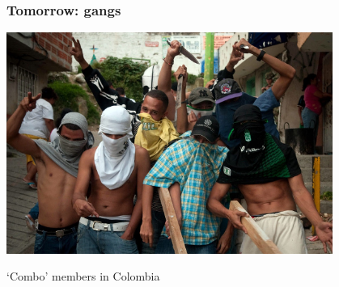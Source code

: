 \documentclass[aspectratio=43]{beamer}
\begin{document}
%
%
%
%
%

\begin{frame}
\frametitle{Tomorrow: gangs}
\centering


\includegraphics[width = 0.8\textwidth]{img/combo}

\vspace{15pt}

`Combo' members in Colombia

\end{frame}

%
%
%
%
%

%
%
%
%
\end{document}
